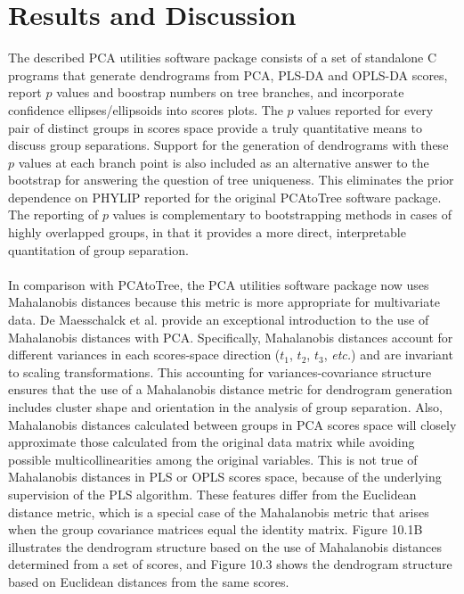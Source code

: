 \section{Results and Discussion}

\begin{doublespace}
The described PCA utilities software package consists of a set of standalone
C programs that generate dendrograms from PCA, PLS-DA and OPLS-DA scores,
report $p$ values and boostrap numbers on tree branches, and incorporate
confidence ellipses/ellipsoids into scores plots. The $p$ values reported for
every pair of distinct groups in scores space provide a truly quantitative
means to discuss group separations. Support for the generation of dendrograms
with these $p$ values at each branch point is also included as an alternative
answer to the bootstrap for answering the question of tree uniqueness. This
eliminates the prior dependence on PHYLIP \cite{retief:mmbio2000}
reported for the original PCAtoTree \cite{werth:abio2010} software
package. The reporting of $p$ values is complementary to bootstrapping methods
in cases of highly overlapped groups, in that it provides a more direct,
interpretable quantitation of group separation.
\\\\
In comparison with PCAtoTree, the PCA utilities software package now uses
Mahalanobis distances because this metric is more appropriate for multivariate
data. De Maesschalck et al. \cite{demaesschalck:cils2000} provide an
exceptional introduction to the use of Mahalanobis distances with PCA.
Specifically, Mahalanobis distances account for different variances in each
scores-space direction ($t_1$, $t_2$, $t_3$, \emph{etc.}) and are invariant
to scaling transformations. This accounting for variances-covariance structure
ensures that the use of a Mahalanobis distance metric for dendrogram generation
includes cluster shape and orientation in the analysis of group separation.
Also, Mahalanobis distances calculated between groups in PCA scores space will
closely approximate those calculated from the original data matrix while
avoiding possible multicollinearities among the original variables. This is
not true of Mahalanobis distances in PLS or OPLS scores space, because of the
underlying supervision of the PLS algorithm. These features differ from the
Euclidean distance metric, which is a special case of the Mahalanobis metric
that arises when the group covariance matrices equal the identity matrix.
Figure 10.1B illustrates the dendrogram structure based on the use of
Mahalanobis distances determined from a set of scores, and Figure 10.3 shows
the dendrogram structure based on Euclidean distances from the same scores.
\end{doublespace}

